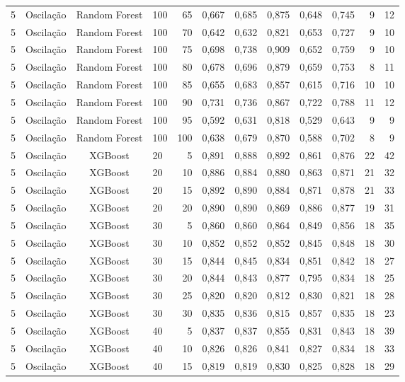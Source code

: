 \begin{longtable}{ccclrrrrrrrr}
5 & Oscilação & Random Forest & 100 & 65 & 0,667 & 0,685 & 0,875 & 0,648 & 0,745 & 9 & 12 \\
5 & Oscilação & Random Forest & 100 & 70 & 0,642 & 0,632 & 0,821 & 0,653 & 0,727 & 9 & 10 \\
5 & Oscilação & Random Forest & 100 & 75 & 0,698 & 0,738 & 0,909 & 0,652 & 0,759 & 9 & 10 \\
5 & Oscilação & Random Forest & 100 & 80 & 0,678 & 0,696 & 0,879 & 0,659 & 0,753 & 8 & 11 \\
5 & Oscilação & Random Forest & 100 & 85 & 0,655 & 0,683 & 0,857 & 0,615 & 0,716 & 10 & 10 \\
5 & Oscilação & Random Forest & 100 & 90 & 0,731 & 0,736 & 0,867 & 0,722 & 0,788 & 11 & 12 \\
5 & Oscilação & Random Forest & 100 & 95 & 0,592 & 0,631 & 0,818 & 0,529 & 0,643 & 9 & 9 \\
5 & Oscilação & Random Forest & 100 & 100 & 0,638 & 0,679 & 0,870 & 0,588 & 0,702 & 8 & 9 \\
5 & Oscilação & XGBoost & 20 & 5 & 0,891 & 0,888 & 0,892 & 0,861 & 0,876 & 22 & 42 \\
5 & Oscilação & XGBoost & 20 & 10 & 0,886 & 0,884 & 0,880 & 0,863 & 0,871 & 21 & 32 \\
5 & Oscilação & XGBoost & 20 & 15 & 0,892 & 0,890 & 0,884 & 0,871 & 0,878 & 21 & 33 \\
5 & Oscilação & XGBoost & 20 & 20 & 0,890 & 0,890 & 0,869 & 0,886 & 0,877 & 19 & 31 \\
5 & Oscilação & XGBoost & 30 & 5 & 0,860 & 0,860 & 0,864 & 0,849 & 0,856 & 18 & 35 \\
5 & Oscilação & XGBoost & 30 & 10 & 0,852 & 0,852 & 0,852 & 0,845 & 0,848 & 18 & 30 \\
5 & Oscilação & XGBoost & 30 & 15 & 0,844 & 0,845 & 0,834 & 0,851 & 0,842 & 18 & 27 \\
5 & Oscilação & XGBoost & 30 & 20 & 0,844 & 0,843 & 0,877 & 0,795 & 0,834 & 18 & 25 \\
5 & Oscilação & XGBoost & 30 & 25 & 0,820 & 0,820 & 0,812 & 0,830 & 0,821 & 18 & 28 \\
5 & Oscilação & XGBoost & 30 & 30 & 0,835 & 0,836 & 0,815 & 0,857 & 0,835 & 18 & 23 \\
5 & Oscilação & XGBoost & 40 & 5 & 0,837 & 0,837 & 0,855 & 0,831 & 0,843 & 18 & 39 \\
5 & Oscilação & XGBoost & 40 & 10 & 0,826 & 0,826 & 0,841 & 0,827 & 0,834 & 18 & 33 \\
5 & Oscilação & XGBoost & 40 & 15 & 0,819 & 0,819 & 0,830 & 0,825 & 0,828 & 18 & 29 \\

\end{longtable}
